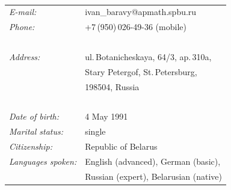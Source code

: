 \documentclass[a4paper,oneside,12pt]{article}
\begin{document}
\begin{centering}
\begin{minipage}{0.70\linewidth}%
\vspace{-1.5em}{\Huge\bfseries Ivan Baravy}

~\\[-1.5em]

\hspace{1.9em}\begin{tabularx}{\linewidth}{ll}
{\it E-mail:}		& ivan\_baravy@apmath.spbu.ru\\
{\it Phone:}	        & +7\,(950)\,026-49-36 (mobile)\\
~\\[-1.0em]
{\it Address:}	    & ul.\,Botanicheskaya, 64/3, ap.\,310a,\\
                    & Stary Petergof, St.\,Petersburg,\\
                    & 198504, Russia\\
~\\[-1.0em]
{\it Date of birth:}	& 4 May 1991\\
{\it Marital status:}& single\\
{\it Citizenship:}   & Republic of Belarus\\
{\it Languages spoken:}& English (advanced), German (basic),\\
		       &Russian (expert), Belarusian (native)\\
\end{tabularx}
\end{minipage}
\begin{minipage}{0.23\linewidth}%
\begin{flushright}
{%
\setlength{\fboxsep}{0pt}%
\setlength{\fboxrule}{0pt}%
}%
\end{flushright}
\end{minipage}
\end{centering}
~\\[1.5em]
\end{document}
